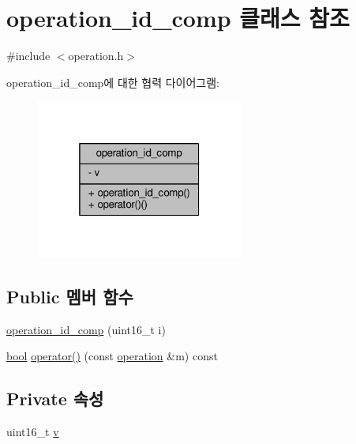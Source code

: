 \hypertarget{classavdecc__lib_1_1operation__id__comp}{}\section{operation\+\_\+id\+\_\+comp 클래스 참조}
\label{classavdecc__lib_1_1operation__id__comp}


{\ttfamily \#include $<$operation.\+h$>$}



operation\+\_\+id\+\_\+comp에 대한 협력 다이어그램\+:
\nopagebreak
\begin{figure}[H]
\begin{center}
\leavevmode
\includegraphics[width=193pt]{classavdecc__lib_1_1operation__id__comp__coll__graph}
\end{center}
\end{figure}
\subsection*{Public 멤버 함수}
\begin{DoxyCompactItemize}
\item 
\hyperlink{classavdecc__lib_1_1operation__id__comp_ab6f8fcf491634ca78d8730bb8ee79dfb}{operation\+\_\+id\+\_\+comp} (uint16\+\_\+t i)
\item 
\hyperlink{avb__gptp_8h_af6a258d8f3ee5206d682d799316314b1}{bool} \hyperlink{classavdecc__lib_1_1operation__id__comp_a0be57f4eb951c223c3dac12036d76b9e}{operator()} (const \hyperlink{classavdecc__lib_1_1operation}{operation} \&m) const 
\end{DoxyCompactItemize}
\subsection*{Private 속성}
\begin{DoxyCompactItemize}
\item 
uint16\+\_\+t \hyperlink{classavdecc__lib_1_1operation__id__comp_ac5f38113a34f9eab3e7782eade81d266}{v}
\end{DoxyCompactItemize}



